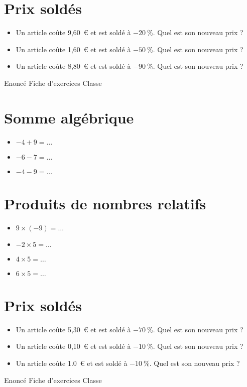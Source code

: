 \documentclass[a4paper,11pt,fleqn]{article}		%
\begin{document}
\section{Prix soldés}
\begin{itemize}

  \item Un article coûte 9,60~€ et est soldé à $-20~\%$. Quel est son nouveau prix ?
  \item Un article coûte 1,60~€ et est soldé à $-50~\%$. Quel est son nouveau prix ?
  \item Un article coûte 8,80~€ et est soldé à $-90~\%$. Quel est son nouveau prix ?
\end{itemize}
\newpage
\setcounter{exo}{0}
\setcounter{section}{0}
{Enoncé} \hfill {\huge Fiche d'exercices } \hfill {Classe}

\section{Somme algébrique}
\begin{itemize}

  \item $-4 +9=\ldots$
  \item $-6 -7=\ldots$
  \item $-4 -9=\ldots$
\end{itemize}


\section{Produits de nombres relatifs}
\begin{itemize}

  \item $9\times(-9)=\ldots$
  \item $-2\times5=\ldots$
  \item $4\times5=\ldots$
  \item $6\times5=\ldots$
\end{itemize}


\section{Prix soldés}
\begin{itemize}

  \item Un article coûte 5,30~€ et est soldé à $-70~\%$. Quel est son nouveau prix ?
  \item Un article coûte 0,10~€ et est soldé à $-10~\%$. Quel est son nouveau prix ?
  \item Un article coûte 1.0~€ et est soldé à $-10~\%$. Quel est son nouveau prix ?
\end{itemize}
\newpage
\setcounter{exo}{0}
\setcounter{section}{0}
{Enoncé} \hfill {\huge Fiche d'exercices } \hfill {Classe}
\end{document}
